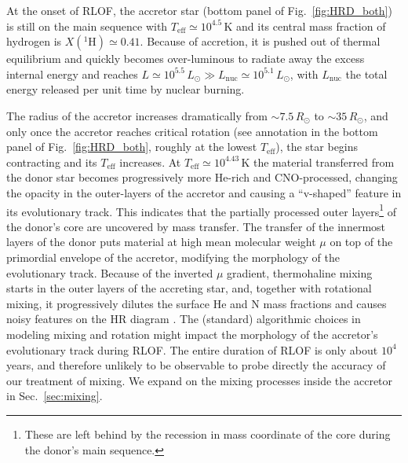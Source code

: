 \documentclass[twocolumn,twocolappendix,trackchanges]{aastex63}
\DeclareRobustCommand{\Figref}[1]{Fig.~\ref{#1}}
\DeclareRobustCommand{\Secref}[1]{Sec.~\ref{#1}}
\begin{document}
At the onset of RLOF, the accretor star (bottom panel of \Figref{fig:HRD_both}) is still on the main sequence with
$T_\mathrm{eff}\simeq10^{4.5}$\,K and its central mass fraction of hydrogen is $X(^1\mathrm{H})\simeq
0.41$. Because of accretion, it is pushed out of thermal equilibrium and quickly becomes over-luminous to radiate away the excess internal energy and reaches $L\simeq10^{5.5}\,L_\odot\gg
L_\mathrm{nuc}\simeq
10^{5.1}\,L_\odot$, with
$L_\mathrm{nuc}$ the total energy released per unit time by nuclear burning.

The radius of the accretor increases dramatically from
$\sim7.5\,R_\odot$ to $\sim35\,R_\odot$, and only once the accretor
reaches critical rotation (see annotation in the bottom panel of
\Figref{fig:HRD_both}, roughly at the lowest $T_\mathrm{eff}$), the star begins
contracting and its $T_\mathrm{eff}$ increases. At
$T_\mathrm{eff}\simeq 10^{4.43}$\,K the material transferred from the
donor star becomes progressively more He-rich and CNO-processed,
changing the opacity in the outer-layers of the accretor and
causing a ``v-shaped'' feature in its evolutionary
track. This
indicates that the partially processed outer layers\footnote{These are
  left behind by the recession in mass coordinate of the core
during the donor's main sequence.} of the donor's
core are uncovered by mass
transfer. %
The transfer of the innermost layers of the donor puts material at
high mean molecular weight $\mu$ on top of the primordial envelope of
the accretor, modifying the morphology of the evolutionary
track. Because of the inverted $\mu$ gradient, thermohaline mixing
starts in the outer layers of the accreting star, and, together with
rotational mixing, it progressively dilutes the surface He and N mass
fractions and causes noisy features on the HR diagram
\citep[e.g.,][]{cantiello:07}. The (standard) algorithmic choices in
modeling mixing and rotation might impact the morphology of the
accretor's evolutionary track during RLOF. The entire duration of RLOF
is only about $10^4$\,years, and therefore unlikely to be observable
to probe directly the accuracy of our treatment of mixing. We expand
on the mixing processes inside the accretor in \Secref{sec:mixing}.
\end{document}
